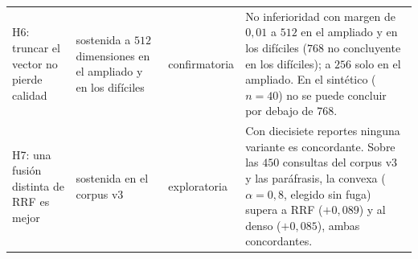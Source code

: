 \documentclass[11pt,letterpaper]{article}
\numberwithin{equation}{section}
\begin{document}
\begin{table}[htbp]
\begin{tabularx}{\textwidth}{@{}>{\raggedright\arraybackslash}p{3.6cm} >{\raggedright\arraybackslash}p{2.5cm} >{\raggedright\arraybackslash}p{2.2cm} Y@{}}
H6: truncar el vector no pierde calidad & sostenida a $512$ dimensiones en el ampliado y en los difíciles & confirmatoria & No inferioridad con margen de $0{,}01$ a $512$ en el ampliado y en los difíciles ($768$ no concluyente en los difíciles); a $256$ solo en el ampliado. En el sintético ($n=40$) no se puede concluir por debajo de $768$. \\
H7: una fusión distinta de RRF es mejor & sostenida en el corpus v3 & exploratoria & Con diecisiete reportes ninguna variante es concordante. Sobre las $450$ consultas del corpus v3 y las paráfrasis, la convexa ($\alpha=0{,}8$, elegido sin fuga) supera a RRF ($+0{,}089$) y al denso ($+0{,}085$), ambas concordantes. \\
\bottomrule
\end{tabularx}
\end{table}
\end{document}
